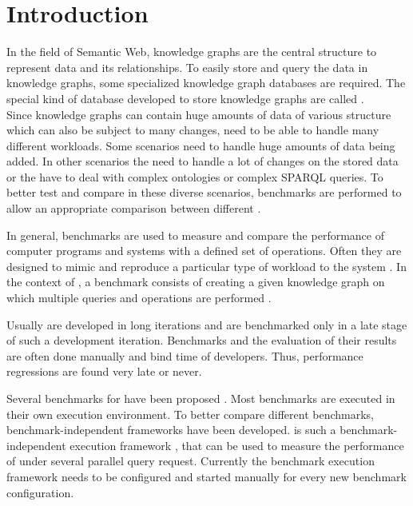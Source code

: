 \chapter{Introduction}
\label{ch:introduction}




In the field of Semantic Web, knowledge graphs are the central structure to represent data and its relationships.
To easily store and query the data in knowledge graphs, some specialized knowledge graph databases are required.
The special kind of database developed to store knowledge graphs are called \tsp{}. \\

Since knowledge graphs can contain huge amounts of data of various structure which can also be subject to many changes, \tsp{} need to be able to handle many different workloads.
Some scenarios need to handle huge amounts of data being added.
In other scenarios the \tsp{} need to handle a lot of changes on the stored data or the \tsp{} have to deal with complex ontologies or complex SPARQL queries.
To better test and compare \tsp{} in these diverse scenarios, benchmarks are performed to allow an appropriate comparison between different \tsp{} \cite{saleemHowRepresentativeSPARQL2019}.

In general, benchmarks are used to measure and compare the performance of computer programs and systems with a defined set of operations.
Often they are designed to mimic and reproduce a particular type of workload to the system \cite{saleemFEASIBLEFeatureBasedSPARQL2015, morseyDBpediaSPARQLBenchmark2011}.
In the context of \tsp{}, a benchmark consists of creating a given knowledge graph on which multiple queries and operations are performed \cite{conradsIguanaGenericFramework2017}.

Usually \tsp{} are developed in long iterations and are benchmarked only in a late stage of such a development iteration.
Benchmarks and the evaluation of their results are often done manually and bind time of developers.
Thus, performance regressions are  found very late or never.


Several benchmarks for \tsp{} have been proposed \cite{saleemHowRepresentativeSPARQL2019}.
Most benchmarks are executed in their own execution environment.
To better compare different benchmarks, benchmark-independent frameworks have been developed.
\iguana{} is such a benchmark-independent execution framework \cite{conradsIguanaGenericFramework2017}, that can be used to measure the performance of \tsp{} under several parallel query request.
Currently the benchmark execution framework needs to be configured and started manually for every new benchmark configuration.

